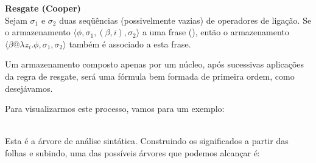 \begin{oframed} \textbf{Resgate (Cooper)}\\
Sejam $\sigma_1$ e $\sigma_2$ duas seqüências (possivelmente vazias) de operadores de ligação. Se o armazenamento $\langle\phi, \sigma_1, (\beta, i), \sigma_2\rangle$ a uma frase (), então o armazenamento $\langle\beta @ \lambda z_i . \phi , \sigma_1, \sigma_2 \rangle$ também é associado a esta frase.
\end{oframed}

Um armazenamento composto apenas por um núcleo, após sucessivas aplicações da regra de resgate, será uma fórmula bem formada de primeira ordem, como desejávamos.

Para visualizarmos este processo, vamos para um exemplo:

 \\ 

Esta é a árvore de análise sintática. Construindo os significados a partir das folhas e subindo, uma das possíveis árvores que podemos alcançar é:
\footnotesize

